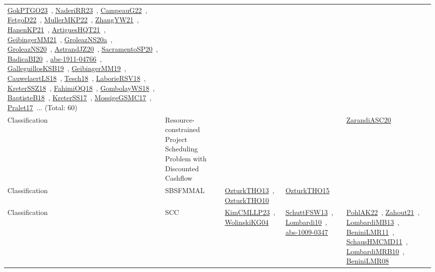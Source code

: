 {\begin{longtable}{lp{3cm}>{\raggedright\arraybackslash}p{6cm}>{\raggedright\arraybackslash}p{6cm}>{\raggedright\arraybackslash}p{8cm}}
\href{../works/GokPTGO23.pdf}{GokPTGO23}~\cite{GokPTGO23}, \href{../works/NaderiRR23.pdf}{NaderiRR23}~\cite{NaderiRR23}, \href{../works/CampeauG22.pdf}{CampeauG22}~\cite{CampeauG22}, \href{../works/FetgoD22.pdf}{FetgoD22}~\cite{FetgoD22}, \href{../works/MullerMKP22.pdf}{MullerMKP22}~\cite{MullerMKP22}, \href{../works/ZhangYW21.pdf}{ZhangYW21}~\cite{ZhangYW21}, \href{../works/HanenKP21.pdf}{HanenKP21}~\cite{HanenKP21}, \href{../works/ArtiguesHQT21.pdf}{ArtiguesHQT21}~\cite{ArtiguesHQT21}, \href{../works/GeibingerMM21.pdf}{GeibingerMM21}~\cite{GeibingerMM21}, \href{../works/GroleazNS20a.pdf}{GroleazNS20a}~\cite{GroleazNS20a}, \href{../works/GroleazNS20.pdf}{GroleazNS20}~\cite{GroleazNS20}, \href{../works/AstrandJZ20.pdf}{AstrandJZ20}~\cite{AstrandJZ20}, \href{../works/SacramentoSP20.pdf}{SacramentoSP20}~\cite{SacramentoSP20}, \href{../works/BadicaBI20.pdf}{BadicaBI20}~\cite{BadicaBI20}, \href{../works/abs-1911-04766.pdf}{abs-1911-04766}~\cite{abs-1911-04766}, \href{../works/GalleguillosKSB19.pdf}{GalleguillosKSB19}~\cite{GalleguillosKSB19}, \href{../works/GeibingerMM19.pdf}{GeibingerMM19}~\cite{GeibingerMM19}, \href{../works/CauwelaertLS18.pdf}{CauwelaertLS18}~\cite{CauwelaertLS18}, \href{../works/Tesch18.pdf}{Tesch18}~\cite{Tesch18}, \href{../works/LaborieRSV18.pdf}{LaborieRSV18}~\cite{LaborieRSV18}, \href{../works/KreterSSZ18.pdf}{KreterSSZ18}~\cite{KreterSSZ18}, \href{../works/FahimiOQ18.pdf}{FahimiOQ18}~\cite{FahimiOQ18}, \href{../works/GombolayWS18.pdf}{GombolayWS18}~\cite{GombolayWS18}, \href{../works/BaptisteB18.pdf}{BaptisteB18}~\cite{BaptisteB18}, \href{../works/KreterSS17.pdf}{KreterSS17}~\cite{KreterSS17}, \href{../works/MossigeGSMC17.pdf}{MossigeGSMC17}~\cite{MossigeGSMC17}, \href{../works/Pralet17.pdf}{Pralet17}~\cite{Pralet17}... (Total: 60)\\
Classification & Resource-constrained Project Scheduling Problem with Discounted Cashflow &  &  & \href{../works/ZarandiASC20.pdf}{ZarandiASC20}~\cite{ZarandiASC20}\\
Classification & SBSFMMAL & \href{../works/OzturkTHO13.pdf}{OzturkTHO13}~\cite{OzturkTHO13}, \href{../works/OzturkTHO10.pdf}{OzturkTHO10}~\cite{OzturkTHO10} & \href{../works/OzturkTHO15.pdf}{OzturkTHO15}~\cite{OzturkTHO15} & \\
Classification & SCC & \href{../works/KimCMLLP23.pdf}{KimCMLLP23}~\cite{KimCMLLP23}, \href{../works/WolinskiKG04.pdf}{WolinskiKG04}~\cite{WolinskiKG04} & \href{../works/SchuttFSW13.pdf}{SchuttFSW13}~\cite{SchuttFSW13}, \href{../works/Lombardi10.pdf}{Lombardi10}~\cite{Lombardi10}, \href{../works/abs-1009-0347.pdf}{abs-1009-0347}~\cite{abs-1009-0347} & \href{../works/PohlAK22.pdf}{PohlAK22}~\cite{PohlAK22}, \href{../works/Zahout21.pdf}{Zahout21}~\cite{Zahout21}, \href{../works/LombardiMB13.pdf}{LombardiMB13}~\cite{LombardiMB13}, \href{../works/BeniniLMR11.pdf}{BeniniLMR11}~\cite{BeniniLMR11}, \href{../works/SchausHMCMD11.pdf}{SchausHMCMD11}~\cite{SchausHMCMD11}, \href{../works/LombardiMRB10.pdf}{LombardiMRB10}~\cite{LombardiMRB10}, \href{../works/BeniniLMR08.pdf}{BeniniLMR08}~\cite{BeniniLMR08}\\

\end{longtable}}
